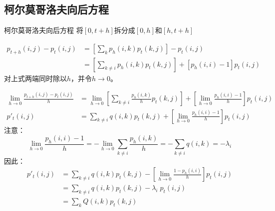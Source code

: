 \documentclass[t]{beamer}
\begin{document}
\subsection{柯尔莫哥洛夫向后方程}
\begin{frame}{柯尔莫哥洛夫向后方程}
  将$[0,t+h]$拆分成$[0,h]$和$[h,t+h]$
\begin{center}
\end{center}
\[\begin{split}
  p_{t+h}(i,j)-p_t(i,j)&=\left[\sum_kp_h(i,k)p_t(k,j) \right]-p_t(i,j)\\
  &=\left[\sum_{k\ne i}p_h(i,k)p_t(k,j) \right]+\left[p_h(i,i)-1\right]p_t(i,j)
  \end{split}
   \]
   对上式两端同时除以$h$，并令$h\to 0$。
\end{frame}


\begin{frame}{}\small
  \[\begin{split}
    {\lim_{h\to 0}\frac{p_{t+h}(i,j)-p_t(i,j)}{h}}&={\lim_{h\to 0}}\left[{\sum_{k\ne i}\frac{p_h(i,k)}{h}}p_t(k,j) \right]+\left[\lim_{h\to 0}\frac{p_h(i,i)-1}{h}\right]p_t(i,j)\\
    {p'_t(i,j)}&={\sum_{k\ne i}q(i,k)}p_t(k,j)+\left[\lim_{h\to 0}\frac{p_h(i,i)-1}{h}\right]p_t(i,j)
    \end{split}  \]
    注意：
    \[ \lim_{h\to 0}\frac{p_h(i,i)-1}{h}=-\lim_{h\to 0}\sum_{k\ne i}\frac{p_h(i,k)}{h}=-\sum_{k\ne i} q(i,k)=-\lambda_i \]
    因此：
    \[\begin{split}
    p'_t(i,j)&=\sum_{k\ne i}q(i,k)p_t(k,j)-{\left[\lim_{h\to 0}\frac{1-p_h(i,i)}{h}\right]}p_t(i,j)\\
    &=\sum_{k\ne i}q(i,k)p_t(k,j)-{\lambda_i}\; p_t(i,j)\\
    &=\sum_k Q(i,k)p_t(k,j)
    \end{split} \]	\end{frame}
\end{document}
